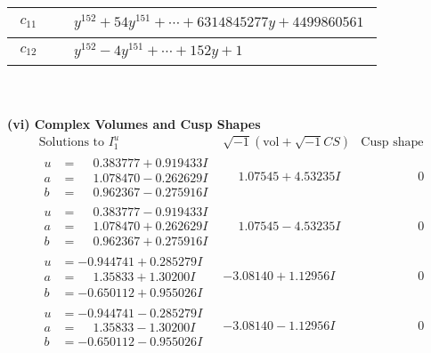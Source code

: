 \documentclass[1p]{elsarticle_modified}
\theoremstyle{definition}
\newcommand{\I}{\sqrt{-1}}
\begin{document}
\begin{tabular}{m{50pt}|m{274pt}}
\hline $$\begin{aligned}c_{11}\end{aligned}$$&$\begin{aligned}
&y^{152}+54 y^{151}+\cdots+6314845277 y+4499860561
\end{aligned}$\\
\hline $$\begin{aligned}c_{12}\end{aligned}$$&$\begin{aligned}
&y^{152}-4 y^{151}+\cdots+152 y+1
\end{aligned}$\\
\hline
\end{tabular}\\~\\
\newpage\flushleft \textbf{(vi) Complex Volumes and Cusp Shapes}
$$\begin{array}{c|c|c}  
\text{Solutions to }I^u_{1}& \I (\text{vol} + \sqrt{-1}CS) & \text{Cusp shape}\\
 \hline 
\begin{aligned}
u &= \phantom{-}0.383777 + 0.919433 I \\
a &= \phantom{-}1.078470 - 0.262629 I \\
b &= \phantom{-}0.962367 - 0.275916 I\end{aligned}
 & \phantom{-}1.07545 + 4.53235 I & \phantom{-0.000000 } 0 \\ \hline\begin{aligned}
u &= \phantom{-}0.383777 - 0.919433 I \\
a &= \phantom{-}1.078470 + 0.262629 I \\
b &= \phantom{-}0.962367 + 0.275916 I\end{aligned}
 & \phantom{-}1.07545 - 4.53235 I & \phantom{-0.000000 } 0 \\ \hline\begin{aligned}
u &= -0.944741 + 0.285279 I \\
a &= \phantom{-}1.35833 + 1.30200 I \\
b &= -0.650112 + 0.955026 I\end{aligned}
 & -3.08140 + 1.12956 I & \phantom{-0.000000 } 0 \\ \hline\begin{aligned}
u &= -0.944741 - 0.285279 I \\
a &= \phantom{-}1.35833 - 1.30200 I \\
b &= -0.650112 - 0.955026 I\end{aligned}
 & -3.08140 - 1.12956 I & \phantom{-0.000000 } 0 \\ \hline\begin{aligned}

\end{aligned}
\end{array}$$
\end{document}
